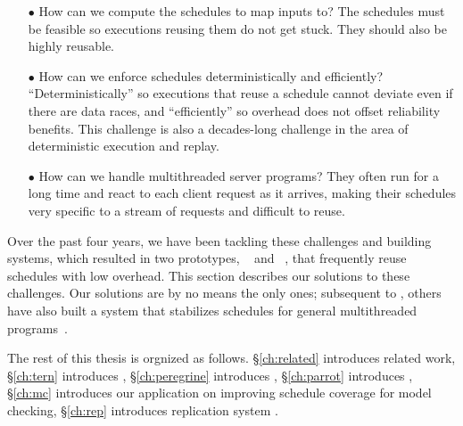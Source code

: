 \begin{enumerate}

\item[$\bullet$] How can we compute the schedules to map inputs to?  The 
schedules
  must be feasible so executions reusing them do not get stuck.
  They should also be highly reusable.

\item[$\bullet$] How can we enforce schedules deterministically and
  efficiently?  ``Deterministically'' so executions that reuse a schedule
  cannot deviate even if there are data races, and ``efficiently'' so
  overhead does not offset reliability benefits.
  This challenge is also a decades-long challenge in the area of
  deterministic execution and replay.

\item[$\bullet$] How can we handle multithreaded server programs?  They often 
run for a
  long time and react to each client request as it arrives, making their
  schedules very specific to a stream of requests and difficult to reuse.

\end{enumerate}

Over the past four years, we have been tackling these challenges and
building \smt systems, which resulted in two \smt prototypes,
\tern~\cite{cui:tern:osdi10} and \peregrine~\cite{peregrine:sosp11}, that
frequently reuse schedules with low overhead.  This section describes our
solutions to these challenges.  Our solutions are by no means the only
ones; subsequent to \tern, others have also built a system that
stabilizes schedules for general multithreaded programs~\cite{dthreads:sosp11}.

The rest of this thesis is orgnized as follows. \S\ref{ch:related} introduces 
related work, \S\ref{ch:tern} introduces \tern, \S\ref{ch:peregrine} introduces 
\peregrine, \S\ref{ch:parrot} introduces \parrot, \S\ref{ch:mc} introduces our 
application on improving schedule coverage for model checking, \S\ref{ch:rep} introduces replication system \msmr.

